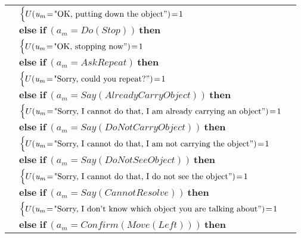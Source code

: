 \begin{footnotesize}
\begin{longtable}{p{2cm}l}
& \;\;\;\;\; $ \begin{cases}U(\mathit{u_m}\!=\!\text{"OK, putting down the object}")\!=\!1 \end{cases}$ \vspace{1mm} \\ & $ \textbf{else if} \ (\mathit{a_m}\!=\!\mathit{Do(Stop)}) \ \textbf{then}$ \\
& \;\;\;\;\; $ \begin{cases}U(\mathit{u_m}\!=\!\text{"OK, stopping now}")\!=\!1 \end{cases}$ \vspace{1mm} \\ & $ \textbf{else if} \ (\mathit{a_m}\!=\!\mathit{AskRepeat}) \ \textbf{then}$ \\
& \;\;\;\;\; $ \begin{cases}U(\mathit{u_m}\!=\!\text{"Sorry, could you repeat?}")\!=\!1 \end{cases}$ \vspace{1mm} \\ & $ \textbf{else if} \ (\mathit{a_m}\!=\!\mathit{Say(AlreadyCarryObject)}) \ \textbf{then}$ \\
& \;\;\;\;\; $ \begin{cases}U(\mathit{u_m}\!=\!\text{"Sorry, I cannot do that, I am already carrying an object}")\!=\!1 \end{cases}$ \vspace{1mm} \\ & $ \textbf{else if} \ (\mathit{a_m}\!=\!\mathit{Say(DoNotCarryObject)}) \ \textbf{then}$ \\
& \;\;\;\;\; $ \begin{cases}U(\mathit{u_m}\!=\!\text{"Sorry, I cannot do that, I am not carrying the object}")\!=\!1 \end{cases}$ \vspace{1mm} \\ & $ \textbf{else if} \ (\mathit{a_m}\!=\!\mathit{Say(DoNotSeeObject)}) \ \textbf{then}$ \\
& \;\;\;\;\; $ \begin{cases}U(\mathit{u_m}\!=\!\text{"Sorry, I cannot do that, I do not see the object}")\!=\!1 \end{cases}$ \vspace{1mm} \\ & $ \textbf{else if} \ (\mathit{a_m}\!=\!\mathit{Say(CannotResolve)}) \ \textbf{then}$ \\
& \;\;\;\;\; $ \begin{cases}U(\mathit{u_m}\!=\!\text{"Sorry, I don't know which object you are talking about}")\!=\!1 \end{cases}$ \vspace{1mm} \\ & $ \textbf{else if} \ (\mathit{a_m}\!=\!\mathit{Confirm(Move(Left))}) \ \textbf{then}$ \\

\end{longtable}
\end{footnotesize}
